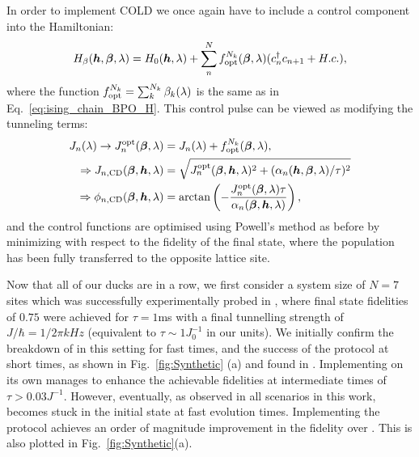 In order to implement COLD we once again have to include a control component into the Hamiltonian:
\begin{equation}\label{eq:ising_control_nocrab}
    \begin{aligned}
        H_{\beta}(\boldsymbol{h}, \boldsymbol{\beta}, \lambda) = H_0(\boldsymbol{h}, \lambda) + \sum_n^N f_{\rm opt}^{N_k}(\boldsymbol{\beta}, \lambda) (c_n^{\dag}c_{n+1} + H.c.),
    \end{aligned}
\end{equation}
where the function $f_{\rm opt}^{N_k} = \sum_k^{N_k} \beta_k(\lambda)$ is the same as in Eq.~\eqref{eq:ising_chain_BPO_H}. This control pulse can be viewed as modifying the tunneling terms:
\begin{equation}\label{eq:synthetic_control_funcs}
    \begin{aligned}
        J_n(\lambda) \rightarrow J_n^{\rm opt}(\boldsymbol{\beta}, \lambda) &= J_n(\lambda) + f_{\rm opt}^{N_k}(\boldsymbol{\beta}, \lambda), \\
        \Rightarrow J_{n, \rm CD}(\boldsymbol{\beta}, \boldsymbol{h}, \lambda) &= \sqrt{J_n^{\rm opt}(\boldsymbol{\beta},\boldsymbol{h}, \lambda)^2 + (\alpha_n(\boldsymbol{h}, \boldsymbol{\beta}, \lambda)/\tau)^2} \\
        \Rightarrow \phi_{n, \mathrm{CD}}(\boldsymbol{\beta}, \boldsymbol{h}, \lambda) &= \arctan\left(-\frac{J_n^{\rm opt}(\boldsymbol{\beta}, \lambda)\tau}{\alpha_n(\boldsymbol{\beta}, \boldsymbol{h}, \lambda)}\right),
    \end{aligned}
\end{equation} 
and the control functions are optimised using Powell's method as before by minimizing with respect to the fidelity of the final state, where the population has been fully transferred to the opposite lattice site. 

Now that all of our ducks are in a row, we first consider a system size of $N=7$ sites which was successfully experimentally probed in \cite{meier_counterdiabatic_2020}, where final state fidelities of $0.75$ were achieved for $\tau = 1$ms with a final tunnelling strength of $J/\hbar = 1/2\pi kHz$ (equivalent to $\tau \sim 1 J_0^{-1}$ in our units). We initially confirm the breakdown of  in this setting for fast times, and the success of the  protocol at short times, as shown in Fig.~\ref{fig:Synthetic} (a) and found in \cite{meier_counterdiabatic_2020}. Implementing  on its own manages to enhance the achievable fidelities at intermediate times of $\tau > 0.03 J^{-1}$. However, eventually, as observed in all scenarios in this work,  becomes stuck in the initial state at fast evolution times. Implementing the  protocol achieves an order of magnitude improvement in the fidelity over . This is also plotted in Fig.~\ref{fig:Synthetic}(a).


